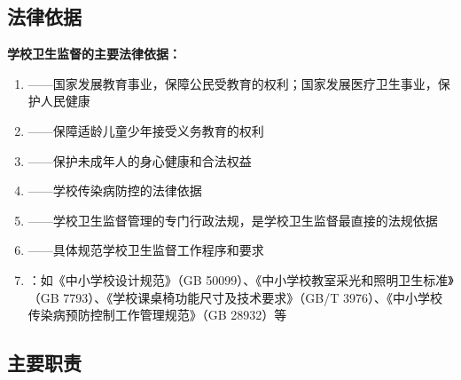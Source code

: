 \subsection{法律依据}

\begin{keybox}
\textbf{学校卫生监督的主要法律依据：}
\begin{enumerate}[leftmargin=*]
    \item {}——国家发展教育事业，保障公民受教育的权利；国家发展医疗卫生事业，保护人民健康
    \item {}——保障适龄儿童少年接受义务教育的权利
    \item {}——保护未成年人的身心健康和合法权益
    \item {}——学校传染病防控的法律依据
    \item {}——学校卫生监督管理的专门行政法规，是学校卫生监督最直接的法规依据
    \item {}——具体规范学校卫生监督工作程序和要求
    \item {}：如《中小学校设计规范》（GB 50099）、《中小学校教室采光和照明卫生标准》（GB 7793）、《学校课桌椅功能尺寸及技术要求》（GB/T 3976）、《中小学校传染病预防控制工作管理规范》（GB 28932）等
\end{enumerate}
\end{keybox}

\subsection{主要职责}

